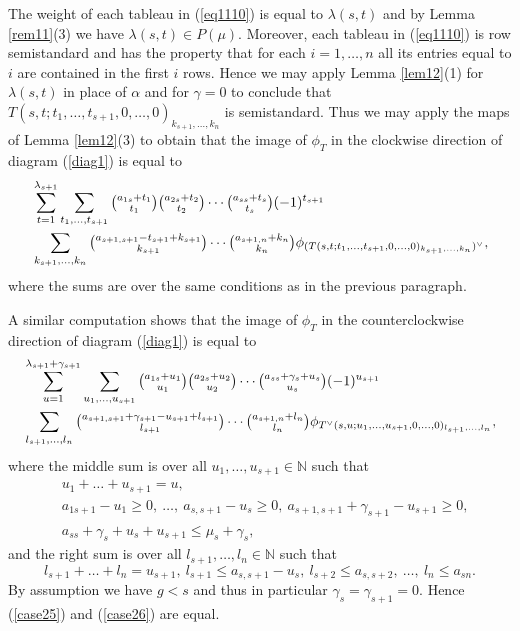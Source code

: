 \documentclass[ALCO,Unicode]{cedram}
\newcommand{\al}{\alpha}
\newcommand{\la}{\lambda}
\numberwithin{equation}{section}
\begin{document}
	The weight of each tableau in (\ref{eq1110}) is equal to $\la(s,t)$ and by Lemma \ref{rem11}(3) we have $\la(s,t) \in P(\mu)$. Moreover, each tableau in (\ref{eq1110}) is row semistandard and has the property that for each $i=1,\dots,n$ all its entries equal to $i$ are contained in the first $i$ rows.  Hence we may apply Lemma \ref{lem12}(1) for $\la(s,t)$ in place of $\al$ and for $\gamma=0$ to conclude that $T(s,t;t_1,\dots,t_{s+1},0,\dots,0)_{k_{s+1},\dots,k_n}$ is semistandard. Thus we may apply the maps of Lemma \ref{lem12}(3) to obtain that the image of $\phi_T$ in the clockwise direction of diagram (\ref{diag1}) is equal to 
	\begin{align}\label{case25}
		&\sum_{t=1}^{\lambda_{s+1}}\sum_{\substack{t_1,\dots,t_{s+1}}}\tbinom{a_{1s}+t_1}{t_1}\tbinom{a_{2s}+t_2}{t_2} \cdots \tbinom{a_{ss}+t_s}{t_s}(-1)^{t_{s+1}}\\& \sum_{k_{s+1},\dots,k_n}\tbinom{a_{s+1,s+1}-t_{s+1}+k_{s+1}}{k_{s+1}}\cdots\tbinom{a_{s+1,n}+k_n}{k_n}\phi_{(T(s,t;t_1,\dots,t_{s+1},0,\dots,0)_{k_{s+1},\dots,k_n})^{\vee}}\nonumber,
	\end{align} where the sums are over the same conditions as in the previous paragraph.
	
A similar computation shows that the image of $\phi_T$ in the counterclockwise direction of diagram (\ref{diag1}) is equal to \begin{align}\label{case26}
	&\sum_{u=1}^{\lambda_{s+1}+\gamma_{s+1}}\sum_{u_1,\dots,u_{s+1}}\tbinom{a_{1s}+u_1}{u_1}\tbinom{a_{2s}+u_2}{u_2} \cdots \tbinom{a_{ss} + \gamma_s + u_s}{u_s}(-1)^{u_{s+1}}\\& \sum_{l_{s+1},\dots,l_n}\tbinom{a_{s+1,s+1}+\gamma_{s+1}-u_{s+1}+l_{s+1}}{l_{s+1}}\cdots\tbinom{a_{s+1,n}+l_n}{l_n}\phi_{T^{\vee}(s,u;u_1,\dots,u_{s+1},0,\dots,0)_{l_{s+1},\dots,l_n}}\nonumber,
\end{align} where the middle sum is over all  $u_1,\dots,u_{s+1} \in \mathbb{N}$ such that \begin{align}\label{case27}&u_{1}+\dots+u_{s+1}=u,\\\label{case28}&a_{1s+1}-u_1 \ge 0, \ \dots, \ a_{s,s+1}-u_{s} \ge 0, \ a_{s+1,s+1}+\gamma_{s+1}-u_{s+1} \ge 0, \\\label{case29}&a_{ss} + \gamma_s +u_s+u_{s+1}  \le \mu_s +\gamma_s,\end{align}
and the right sum is over all 
$l_{s+1},\dots, l_n \in \mathbb{N}$ such that \begin{equation}\label{case211}l_{s+1}+\dots+l_n=u_{s+1}, \  l_{s+1} \le a_{s,s+1}-u_s, \  l_{s+2} \le a_{s,s+2}, \  \dots, \  l_n \le a_{sn}.\end{equation} 
By assumption we have $g<s$ and thus in particular $\gamma_s = \gamma_{s+1}=0$. Hence (\ref{case25}) and (\ref{case26}) are equal.
\end{document}

